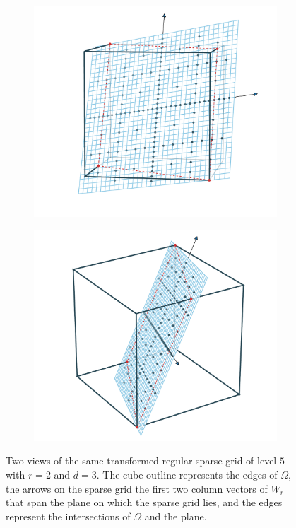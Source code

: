 \documentclass[
  a4paper,  %
  twoside,  %
  bibliography=totoc,
  headsepline,
  cleardoublepage=empty,
  parskip=half,
  draft=false
]{scrbook}
\begin{document}
\newpage
\begin{mdframed}[style=style]
\vspace{2.5mm}
\begin{figure}[H]
\begin{subfigure}{.5\textwidth}
  \centering
  \includegraphics[width=\linewidth]{graphics/surrogate_vis_2}
\end{subfigure}%
\begin{subfigure}{.5\textwidth}
  \centering
  \includegraphics[width=\linewidth]{graphics/surrogate_vis_1}
\end{subfigure}
\vspace{2.5mm}
\delimit
\caption{Two views of the same transformed regular sparse grid of level $5$ with $r=2$ and $d=3$.
The \darkblue cube outline represents the edges of $\Omega$, the arrows on the sparse grid the first two column vectors of $W_r$ that span the plane on which the sparse grid lies, and the \red edges represent the intersections of $\Omega$ and the plane.}
\label{fig:trans_vis}
\end{figure}
\end{mdframed}
\end{document}

